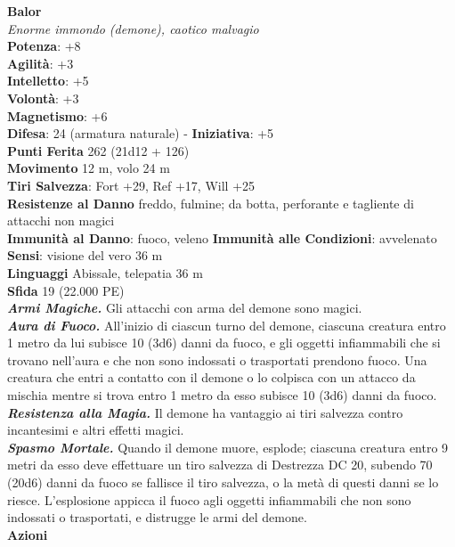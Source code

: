 \begin{multicols}{2}
\medskip\textbf{Balor}\\
\emph{Enorme immondo (demone), caotico malvagio}\\
\textbf{Potenza}: +8\\
\textbf{Agilità}: +3\\
\textbf{Intelletto}: +5\\
\textbf{Volontà}: +3\\
\textbf{Magnetismo}: +6\\
\textbf{Difesa}: 24 (armatura naturale) - \textbf{Iniziativa}: +5\\
\textbf{Punti Ferita} 262 (21d12 + 126)\\
\textbf{Movimento} 12 m, volo 24 m\\
\textbf{Tiri Salvezza}: Fort +29, Ref +17, Will +25\\
\textbf{Resistenze al Danno} freddo, fulmine; da botta, perforante e tagliente di attacchi non magici\\ 
\textbf{Immunità al Danno}: fuoco, veleno \textbf{Immunità alle Condizioni}: avvelenato\\
\textbf{Sensi}: visione del vero 36 m\\
\textbf{Linguaggi} Abissale, telepatia 36 m\\
\textbf{Sfida} 19 (22.000 PE)\smallskip\\
\emph{\textbf{Armi Magiche.}} Gli attacchi con arma del demone sono magici.\\
\emph{\textbf{Aura di Fuoco.}} All'inizio di ciascun turno del demone, ciascuna creatura entro 1 metro da lui subisce 10 (3d6) danni da fuoco, e gli oggetti infiammabili che si trovano nell'aura e che non sono indossati o trasportati prendono fuoco. Una creatura che entri a contatto con il demone o lo colpisca con un attacco da mischia mentre si trova entro 1 metro da esso subisce 10 (3d6) danni da fuoco.\\
\emph{\textbf{Resistenza alla Magia.}} Il demone ha vantaggio ai tiri salvezza contro incantesimi e altri effetti magici.\\
\emph{\textbf{Spasmo Mortale.}} Quando il demone muore, esplode; ciascuna creatura entro 9 metri da esso deve effettuare un tiro salvezza di Destrezza DC 20, subendo 70 (20d6) danni da fuoco se fallisce il tiro salvezza, o la metà di questi danni se lo riesce. L'esplosione appicca il fuoco agli oggetti infiammabili che non sono indossati o trasportati, e distrugge le armi del demone. \\
\smallskip\textbf{Azioni}\\

\end{multicols}
